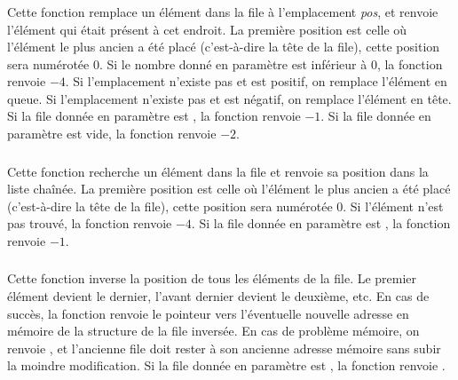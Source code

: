 \subsubsection*{}

\noindent Cette fonction remplace un élément dans la file à l'emplacement \textit{pos}, et renvoie l'élément qui était présent à cet endroit.
La première position est celle où l'élément le plus ancien a été placé (c'est-à-dire la tête de la file), cette position sera numérotée $ 0 $.
Si le nombre donné en paramètre est inférieur à $ 0 $, la fonction renvoie $ -4 $.
Si l'emplacement n'existe pas et est positif, on remplace l'élément en queue.
Si l'emplacement n'existe pas et est négatif, on remplace l'élément en tête.
Si la file donnée en paramètre est , la fonction renvoie $ -1 $.
Si la file donnée en paramètre est vide, la fonction renvoie $ -2 $.


\subsubsection*{}

\noindent Cette fonction recherche un élément dans la file et renvoie sa position dans la liste chaînée.
La première position est celle où l'élément le plus ancien a été placé (c'est-à-dire la tête de la file), cette position sera numérotée $ 0 $.
Si l'élément n'est pas trouvé, la fonction renvoie $ -4 $.
Si la file donnée en paramètre est , la fonction renvoie $ -1 $.


\subsubsection*{}

\noindent Cette fonction inverse la position de tous les éléments de la file.
Le premier élément devient le dernier, l'avant dernier devient le deuxième, etc.
En cas de succès, la fonction renvoie le pointeur vers l'éventuelle nouvelle adresse en mémoire de la structure de la file inversée.
En cas de problème mémoire, on renvoie , et l'ancienne file doit rester à son ancienne adresse mémoire sans subir la moindre modification.
Si la file donnée en paramètre est , la fonction renvoie .


\subsubsection*{}

